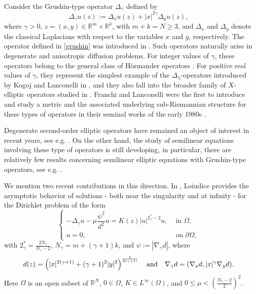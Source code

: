\documentclass[12pt]{amsart}
\begin{document}
Consider the  Grushin-type operator $\Delta_\gamma$ defined by
\begin{equation}\label{grushin}
	\Delta_\gamma u (z) := \Delta_x u(z) + |x|^{2\gamma}\Delta_y u(z),
\end{equation}
where $\gamma>0$, $z=(x,y) \in \mathbb{R}^m\times \mathbb{R}^k$, with $m+k = N\geq3$, and $\Delta_x$ and $\Delta_y$ denote the classical Laplacians with respect to the variables $x$ and $y$, respectively. The operator defined in \eqref{grushin} was introduced in \cite{Grushin,grushin-71}. 
Such operators naturally arise in degenerate and anisotropic diffusion problems. 
For integer values of $\gamma$, these operators belong to the general class of  H\"ormander operators \cite{Hormander-67}. For positive real values of $\gamma$, they represent the simplest example of the $\Delta_\lambda$-operators introduced by Kogoj and Lanconelli in  \cite{Kogoj-Lan-12}, and they also fall into the broader family of $X$-elliptic operators studied in \cite{Lan-Kog-00}. Franchi and Lanconelli were the first to introduce and study a metric and the associated underlying sub-Riemannian structure for these types of operators in their seminal works of the early 1980s \cite{Fr-La-83, Fr-La-84}.

Degenerate second-order elliptic operators have remained an object of interest in recent years, see e.g. \cite{Ab-Fe-Luz-25, Ba-Fur-I-15, Biagi-Monticelli-Punzo}. On the other hand, the study of semilinear equations involving these type of operators is still developing, in particular, there are relatively few results concerning semilinear elliptic equations with  Grushin-type operators, see e.g. \cite{Alves-G-Lo-24,Alves-deH-24,B-Radu-21,Du-Ph-17, La-Pa-02,LTW-20, Loi-19}. 

We mention two recent contributions in this direction. In \cite{Loi-19}, Loiudice provides the asymptotic behavior of solutions - both near the singularity and at infinity - for the Dirichlet problem of the form
$$
\begin{cases}-\Delta_\gamma u-\mu \dfrac{\psi^2}{d^2} u=K(z)|u|^{2^*_\gamma-2} u ,& \text { in } \Omega ,\\ u=0 ,& \text { on } \partial \Omega,\end{cases} 
$$
with $2^*_\gamma=\frac{2 N_\gamma}{N_\gamma-2}$, $N_\gamma=m+(\gamma+1) k$, and $\psi:=\left|\nabla_\gamma d\right|$, where
$$d(z)=\left(|x|^{2(\gamma+1)}+(\gamma+1)^2|y|^2\right)^{\frac{1}{2(\gamma+1)}} \mbox{\quad and\quad } \nabla_\gamma d = (\nabla_x d , |x|^\gamma \nabla_y d).$$
Here \(\Omega\) is an open subset of \(\mathbb{R}^N\), \(0\in \Omega\), $K \in L^{\infty}(\Omega)$, and $  0 \leq \mu<\left(\frac{N_\gamma-2}{2}\right)^2$.
\end{document}
